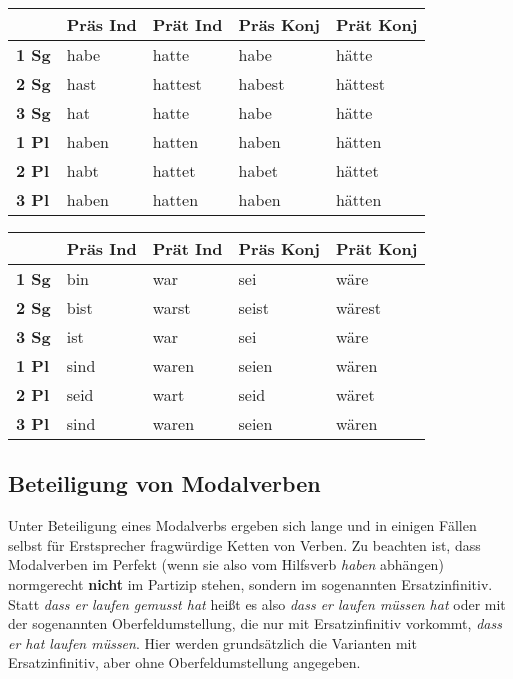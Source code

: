 \begin{center}
  \begin{tabular}{lllll}
    \toprule
    & \textbf{Präs Ind} & \textbf{Prät Ind} & \textbf{Präs Konj} & \textbf{Prät Konj} \\
    \midrule
    \textbf{1 Sg} & habe  & hatte   & habe   & hätte \\
    \textbf{2 Sg} & hast  & hattest & habest & hättest \\
    \textbf{3 Sg} & hat   & hatte   & habe   & hätte \\
    \textbf{1 Pl} & haben & hatten  & haben  & hätten \\
    \textbf{2 Pl} & habt  & hattet  & habet  & hättet \\
    \textbf{3 Pl} & haben & hatten  & haben  & hätten \\
    \bottomrule
  \end{tabular}
\end{center}

\begin{center}
  \begin{tabular}{lllll}
    \toprule
    & \textbf{Präs Ind} & \textbf{Prät Ind} & \textbf{Präs Konj} & \textbf{Prät Konj} \\
    \midrule
    \textbf{1 Sg} & bin   & war     & sei    & wäre   \\
    \textbf{2 Sg} & bist  & warst   & seist  & wärest \\
    \textbf{3 Sg} & ist   & war     & sei    & wäre   \\
    \textbf{1 Pl} & sind  & waren   & seien  & wären  \\
    \textbf{2 Pl} & seid  & wart    & seid   & wäret  \\
    \textbf{3 Pl} & sind  & waren   & seien  & wären \\
    \bottomrule
  \end{tabular}
\end{center}

\subsection{Beteiligung von Modalverben}

Unter Beteiligung eines Modalverbs ergeben sich lange und in einigen Fällen selbst für Erstsprecher fragwürdige Ketten von Verben.
Zu beachten ist, dass Modalverben im Perfekt (wenn sie also vom Hilfsverb \textit{haben} abhängen) normgerecht \textbf{nicht} im Partizip stehen, sondern im sogenannten Ersatzinfinitiv.
Statt \textit{dass er laufen gemusst hat} heißt es also \textit{dass er laufen müssen hat} oder mit der sogenannten Oberfeldumstellung, die nur mit Ersatzinfinitiv vorkommt, \textit{dass er hat laufen müssen}.
Hier werden grundsätzlich die Varianten mit Ersatzinfinitiv, aber ohne Oberfeldumstellung angegeben.

